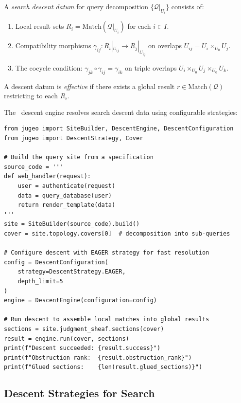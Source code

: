 \documentclass[11pt]{article}
\newcommand{\QuerySheaf}{\mathcal{Q}}
\begin{document}
\begin{definition}\label{def:search-descent}
A \emph{search descent datum} for query decomposition
$\{\QuerySheaf|_{U_i}\}$ consists of:
\begin{enumerate}[noitemsep]
  \item Local result sets $R_i = \mathrm{Match}(\QuerySheaf|_{U_i})$
        for each $i \in I$.
  \item Compatibility morphisms $\gamma_{ij} \colon R_i|_{U_{ij}} \to
        R_j|_{U_{ij}}$ on overlaps $U_{ij} = U_i \times_{U_0} U_j$.
  \item The cocycle condition: $\gamma_{jk} \circ \gamma_{ij} = \gamma_{ik}$
        on triple overlaps $U_i \times_{U_0} U_j \times_{U_0} U_k$.
\end{enumerate}
A descent datum is \emph{effective} if there exists a global result
$r \in \mathrm{Match}(\QuerySheaf)$ restricting to each $R_i$.
\end{definition}

The \JuGeo\ descent engine resolves search descent data using
configurable strategies:

\begin{lstlisting}[style=jugeo-python]
from jugeo import SiteBuilder, DescentEngine, DescentConfiguration
from jugeo import DescentStrategy, Cover

# Build the query site from a specification
source_code = '''
def web_handler(request):
    user = authenticate(request)
    data = query_database(user)
    return render_template(data)
'''
site = SiteBuilder(source_code).build()
cover = site.topology.covers[0]  # decomposition into sub-queries

# Configure descent with EAGER strategy for fast resolution
config = DescentConfiguration(
    strategy=DescentStrategy.EAGER,
    depth_limit=5
)
engine = DescentEngine(configuration=config)

# Run descent to assemble local matches into global results
sections = site.judgment_sheaf.sections(cover)
result = engine.run(cover, sections)
print(f"Descent succeeded: {result.success}")
print(f"Obstruction rank:  {result.obstruction_rank}")
print(f"Glued sections:    {len(result.glued_sections)}")
\end{lstlisting}

\subsection{Descent Strategies for Search}
\end{document}
